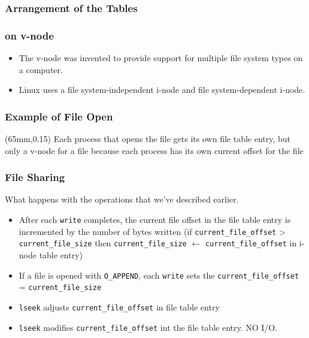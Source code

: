 \documentclass[newPxFont,sthlmFooter,nooffset]{beamer}
\begin{document}
\begin{frame}
  \frametitle{Arrangement of the Tables}
\centering
{}

\end{frame}


\begin{frame}[t]
  \frametitle{on v-node}
\begin{itemize}
\item The v-node was invented to provide support for multiple file system types on a computer.
\item Linux uses a file system-independent i-node and file system-dependent i-node.
\end{itemize}
\end{frame}

\begin{frame}
  \frametitle{Example of File Open}
\centering
{}
\begin{textblock*}{60mm}(65mm,0.15\textheight)
{\footnotesize Each process that opens the file gets its own file table entry, but only a v-node for a file because each process has its own current offset for the file }
\end{textblock*}
\end{frame}

\begin{frame}[t]
  \frametitle{File Sharing}
What happens with the operations that we've described earlier.
\begin{itemize}
\item After each \texttt{write} completes, the current file offset in the file table entry is incremented by the number of bytes written (if \texttt{current\_file\_offset} > \texttt{current\_file\_size} then \texttt{current\_file\_size} $\leftarrow$ \texttt{current\_file\_offset} in i-node table entry)
\item If a file is opened with \texttt{O\_APPEND}, each \texttt{write} sets the \texttt{current\_file\_offset} = \texttt{current\_file\_size}
\item \texttt{lseek} adjusts \texttt{current\_file\_offset} in file table entry
\item \texttt{lseek} modifies \texttt{current\_file\_offset} int the file table entry. NO I/O.
\end{itemize}
\end{frame}
\end{document}
